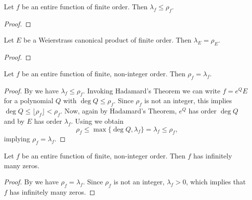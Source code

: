 \begin{theorem} \label{thm:inequality-order-exponent-of-convergence}
    Let $f$ be an entire function of finite order. Then $\lambda_f \leq \rho_f$.
\end{theorem}

\begin{proof}
\end{proof}

\begin{example} \label{exm:exponent-of-convergence}
\end{example}

\begin{theorem} \label{thm:exponent-of-convergence-weierstrass-product}
    Let $E$ be a Weierstrass canonical product of finite order. Then $\lambda_E = \rho_E$.
\end{theorem}

\begin{proof}
\end{proof}

\begin{theorem} \label{thm:finite-non-integer-order-equals-exponent-of-convergence}
    Let $f$ be an entire function of finite, non-integer order. Then $\rho_f = \lambda_f$.
\end{theorem}

\begin{proof}
    By  we have $\lambda_f \leq \rho_f$. Invoking Hadamard's Theorem we can write $f = e^Q E$ for a polynomial $Q$ with $\deg Q \leq \rho_f$. Since $\rho_f$ is not an integer, this implies $\deg Q \leq \lfloor \rho_f \rfloor < \rho_f$. Now, again by Hadamard's Theorem, $e^Q$ has order $\deg Q$ and by  $E$ has order $\lambda_f$. Using  we obtain
    $$ \rho_f \leq \max \{ \deg Q, \lambda_f \} = \lambda_f \leq \rho_f, $$
    implying $\rho_f = \lambda_f$.
\end{proof}

\begin{theorem} \label{thm:finite-non-integer-order-infinite-zeros}
    Let $f$ be an entire function of finite, non-integer order. Then $f$ has infinitely many zeros.
\end{theorem}

\begin{proof}
    By  we have $\rho_f = \lambda_f$. Since $\rho_f$ is not an integer, $\lambda_f > 0$, which implies that $f$ has infinitely many zeros.
\end{proof}

